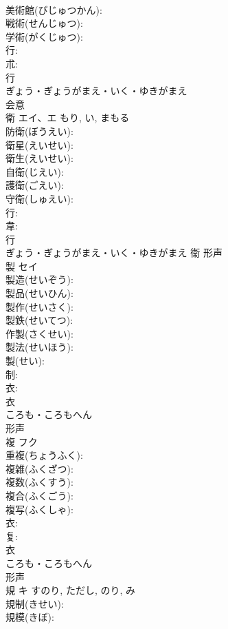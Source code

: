 \documentclass[8pt]{extreport}
\begin{document}
\begin{CJK}{UTF8}{min}
\\	美術館(びじゅつかん): 
\\	戦術(せんじゅつ): 
\\	学術(がくじゅつ): 
\\	行: 
\\	朮: 
\\	行	
\\	ぎょう・ぎょうがまえ・いく・ゆきがまえ	
\\	会意 
\\	衛	エイ、エ		もり, い, まもる	
\\	防衛(ぼうえい): 
\\	衛星(えいせい): 
\\	衛生(えいせい): 
\\	自衛(じえい): 
\\	護衛(ごえい): 
\\	守衛(しゅえい): 
\\	行: 
\\	韋: 
\\	行	
\\	ぎょう・ぎょうがまえ・いく・ゆきがまえ	衞	形声 
\\	製	セイ			
\\	製造(せいぞう): 
\\	製品(せいひん): 
\\	製作(せいさく): 
\\	製鉄(せいてつ): 
\\	作製(さくせい): 
\\	製法(せいほう): 
\\	製(せい): 
\\	制: 
\\	衣: 
\\	衣	
\\	ころも・ころもへん	
\\	形声 
\\	複	フク			
\\	重複(ちょうふく): 
\\	複雑(ふくざつ): 
\\	複数(ふくすう): 
\\	複合(ふくごう): 
\\	複写(ふくしゃ): 
\\	衣: 
\\	复: 
\\	衣	
\\	ころも・ころもへん	
\\	形声 
\\	規	キ		すのり, ただし, のり, み	
\\	規制(きせい): 
\\	規模(きぼ): 

\end{CJK}
\end{document}
